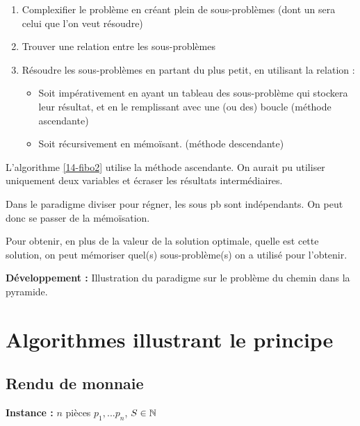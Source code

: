 \begin{principe}
	\enspace
	\begin{enumerate}
		\item Complexifier le problème en créant plein de sous-problèmes (dont un sera celui que l'on veut résoudre)
		\item Trouver une relation entre les sous-problèmes
		\item Résoudre les sous-problèmes en partant du plus petit, en utilisant la relation :\begin{itemize}
			\item Soit impérativement en ayant un tableau des sous-problème qui stockera leur résultat, et en le remplissant avec une (ou des) boucle (méthode ascendante)
			\item Soit récursivement en mémoïsant. (méthode descendante)
		\end{itemize}
		
	\end{enumerate}
\end{principe}

\begin{rem}
	L'algorithme \ref{14-fibo2} utilise la méthode ascendante. On aurait pu utiliser uniquement deux variables et écraser les résultats intermédiaires.
\end{rem}

\begin{rem}
	Dans le paradigme diviser pour régner, les sous pb sont indépendants. On peut donc se passer de la mémoïsation.
\end{rem}

\begin{rem}
	Pour obtenir, en plus de la valeur de la solution optimale, quelle est cette solution, on peut mémoriser quel(s) sous-problème(s) on a utilisé pour l'obtenir.
\end{rem}

\textbf{Développement :} Illustration du paradigme sur le problème du chemin dans la pyramide.

\section{Algorithmes illustrant le principe}

\subsection{Rendu de monnaie}

\textbf{Instance :} $n$ pièces $p_1, ... p_n$, $S \in \mathbb{N}$

